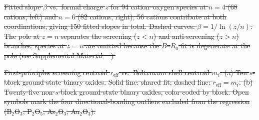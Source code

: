 \documentclass[aps,prmaterials,twocolumn,10pt,superscriptaddress,floatfix]{revtex4-2} %
\providecommand{\DIFdeltex}[1]{{\protect\color{red}\sout{#1}}}                      %
\providecommand{\DIFdelbegin}{} %
\providecommand{\DIFdelFL}[1]{\DIFdel{#1}} %
\providecommand{\DIFdel}[1]{\texorpdfstring{\DIFdeltex{#1}}{}} %
\newcommand{\DIFscaledelfig}{0.5}
\newlength{\DIFdelgraphicswidth} %
\newlength{\DIFdelgraphicsheight} %
\newcommand{\DIFdelincludegraphics}[2][]{%
\sbox{\DIFdelgraphicsbox}{\DIFOincludegraphics[#1]{#2}}%
\settoboxwidth{\DIFdelgraphicswidth}{\DIFdelgraphicsbox} %
\settoboxtotalheight{\DIFdelgraphicsheight}{\DIFdelgraphicsbox} %
\scalebox{\DIFscaledelfig}{%
\parbox[b]{\DIFdelgraphicswidth}{\usebox{\DIFdelgraphicsbox}\\[-\baselineskip] \rule{\DIFdelgraphicswidth}{0em}}\llap{\resizebox{\DIFdelgraphicswidth}{\DIFdelgraphicsheight}{%
\setlength{\unitlength}{\DIFdelgraphicswidth}%
\begin{picture}(1,1)%
\thicklines\linethickness{2pt} %
{\color[rgb]{1,0,0}\put(0,0){\framebox(1,1){}}}%
{\color[rgb]{1,0,0}\put(0,0){\line( 1,1){1}}}%
{\color[rgb]{1,0,0}\put(0,1){\line(1,-1){1}}}%
\end{picture}%
}\hspace*{3pt}}} %
} %
\DeclareRobustCommand{\DIFdelbegin}{\DIFOdelbegin \let\includegraphics\DIFdelincludegraphics} %
\begin{document}
\DIFdelbegin %
{%
\DIFdelFL{Fitted slope $\beta$ vs.\ formal charge $z$ for 94
cation--oxygen species at $n=4$ (68 cations, left) and $n=6$ (82
cations, right); 56 cations contribute at both coordinations, giving
150 fitted slopes in total.  Dashed curves: $\beta=1/\ln(z/n)$.  The
pole at $z=n$ separates the screening ($z<n$) and anti-screening
($z>n$) branches; species at $z=n$ are omitted because the $B$--$R_0$
fit is degenerate at the pole (see Supplemental Material
\mbox{%
\cite{suppmat}}\hskip0pt%
).}}

{%
\DIFdelFL{First-principles screening centroid $r_{\mathrm{eff}}$ vs.\ Boltzmann shell
centroid $m_i$.  (a) Ten $s$-block ground-state binary oxides.  Solid
line: shared fit; dashed line: $r_{\mathrm{eff}}=m_i$.  (b)
Twenty-five non-$s$-block ground-state binary oxides, color-coded by
block.  Open symbols mark the four directional-bonding outliers
excluded from the regression (B$_2$O$_3$, P$_2$O$_5$, As$_2$O$_3$,
Au$_2$O$_3$).}}
\end{document}
